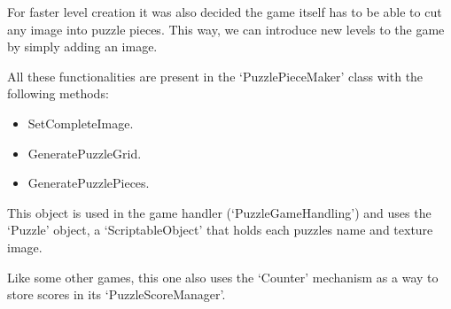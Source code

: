For faster level creation it was also decided the game itself has to be able to cut any image into puzzle pieces. This way, we can introduce new levels to the game by simply adding an image.

All these functionalities are present in the `PuzzlePieceMaker' class with the following methods:

\begin{itemize}
    \item SetCompleteImage.
    \item GeneratePuzzleGrid.
    \item GeneratePuzzlePieces.
\end{itemize}

This object is used in the game handler (`PuzzleGameHandling') and uses the `Puzzle' object, a `ScriptableObject' that holds each puzzles name and texture image.

Like some other games, this one also uses the `Counter' mechanism as a way to store scores in its `PuzzleScoreManager'.

